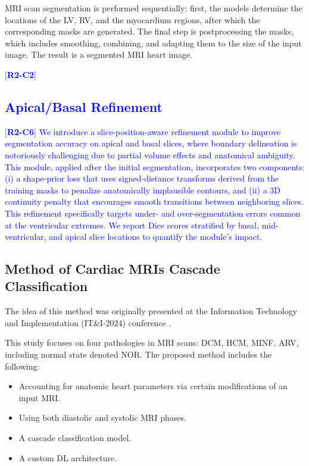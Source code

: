 \documentclass[fleqn,10pt]{wlscirep}
\newcommand{\revtag}[2]{[\textbf{R#1-C#2}]}
\newcommand{\Rtwo}[1]{\textcolor{blue}{#1}}
\begin{document}
MRI scan segmentation is performed sequentially: first, the models determine the locations of the LV, RV, and the myocardium regions, after which the corresponding masks are generated. The final step is postprocessing the masks, which includes smoothing, combining, and adapting them to the size of the input image. The result is a segmented MRI heart image.

\Rtwo{\revtag{2}{2}\subsection*{Apical/Basal Refinement}}
\Rtwo{\revtag{2}{6} %
We introduce a slice-position-aware refinement module to improve segmentation accuracy on apical and basal slices, where boundary delineation is notoriously challenging due to partial volume effects and anatomical ambiguity. This module, applied after the initial segmentation, incorporates two components: (i) a shape-prior loss that uses signed-distance transforms derived from the training masks to penalize anatomically implausible contours, and (ii) a 3D continuity penalty that encourages smooth transitions between neighboring slices. This refinement specifically targets under- and over-segmentation errors common at the ventricular extremes. We report Dice scores stratified by basal, mid-ventricular, and apical slice locations to quantify the module's impact.
}

\subsection*{Method of Cardiac MRIs Cascade Classification}

The idea of this method was originally presented at the Information Technology and Implementation (IT\&I-2024) conference \cite{Slobodzian:2025}.

This study focuses on four pathologies in MRI scans: DCM, HCM, MINF, ARV, including normal state denoted NOR. The proposed method includes the following:

\begin{itemize}
    \item Accounting for anatomic heart parameters via certain modifications of an input MRI.
    \item Using both diastolic and systolic MRI phases.
    \item A cascade classification model.
    \item A custom DL architecture.
\end{itemize}
\end{document}
